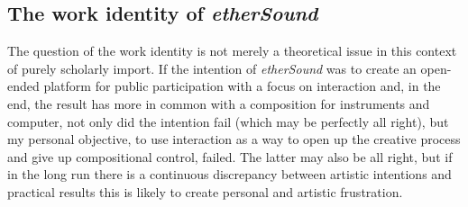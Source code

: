 
\subsection{The work identity of \emph{etherSound}}
\label{sec:ident-emph}

The question of the work identity is not merely a theoretical issue in this context of purely scholarly import. If the intention of \emph{etherSound} was to create an open-ended platform for public participation with a focus on interaction and, in the end, the result has more in common with a composition for instruments and computer, not only did the intention fail (which may be perfectly all right), but my personal objective, to use interaction as a way to open up the creative process and give up compositional control, failed. The latter may also be all right, but if in the long run there is a continuous discrepancy between artistic intentions and practical results this is likely to create personal and artistic frustration. 

